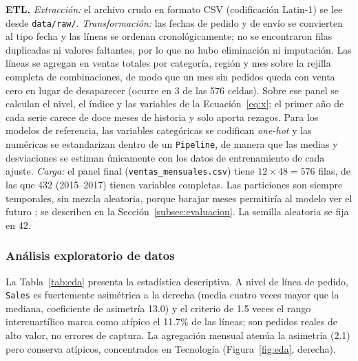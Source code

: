 \documentclass[pdflatex,sn-mathphys-num]{sn-jnl}
\begin{document}
\textbf{ETL.} \textit{Extracción:} el archivo crudo en formato CSV (codificación Latin-1) se lee desde \texttt{data/raw/}. \textit{Transformación:} las fechas de pedido y de envío se convierten al tipo fecha y las líneas se ordenan cronológicamente; no se encontraron filas duplicadas ni valores faltantes, por lo que no hubo eliminación ni imputación. Las líneas se agregan en ventas totales por categoría, región y mes sobre la rejilla completa de combinaciones, de modo que un mes sin pedidos queda con venta cero en lugar de desaparecer (ocurre en 3 de las 576 celdas). Sobre ese panel se calculan el nivel, el índice y las variables de la Ecuación~\eqref{eq:x}; el primer año de cada serie carece de doce meses de historia y solo aporta rezagos. Para los modelos de referencia, las variables categóricas se codifican \emph{one-hot} y las numéricas se estandarizan dentro de un \texttt{Pipeline}, de manera que las medias y desviaciones se estiman únicamente con los datos de entrenamiento de cada ajuste. \textit{Carga:} el panel final (\texttt{ventas\_mensuales.csv}) tiene $12\times48=576$ filas, de las que 432 (2015--2017) tienen variables completas. Las particiones son siempre temporales, sin mezcla aleatoria, porque barajar meses permitiría al modelo ver el futuro \cite{bergmeir2018,cerqueira2020}; se describen en la Sección~\ref{subsec:evaluacion}. La semilla aleatoria se fija en 42.

\subsubsection{Análisis exploratorio de datos}\label{subsubsec:eda}

La Tabla~\ref{tab:eda} presenta la estadística descriptiva. A nivel de línea de pedido, \texttt{Sales} es fuertemente asimétrica a la derecha (media cuatro veces mayor que la mediana, coeficiente de asimetría 13.0) y el criterio de 1.5 veces el rango intercuartílico marca como atípico el 11.7\% de las líneas; son pedidos reales de alto valor, no errores de captura. La agregación mensual atenúa la asimetría (2.1) pero conserva atípicos, concentrados en Tecnología (Figura~\ref{fig:eda}, derecha).
\end{document}
